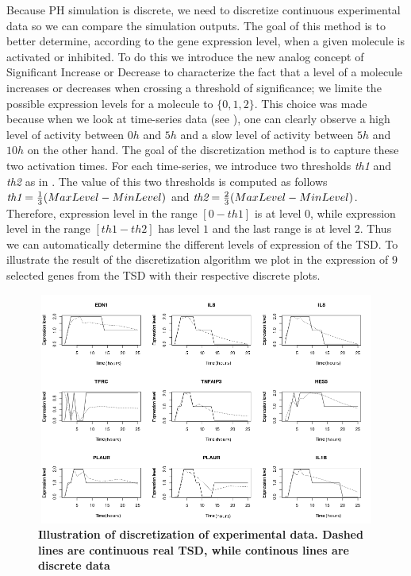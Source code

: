Because PH simulation is discrete, we need to discretize continuous experimental data so we can compare the simulation outputs.
The goal of this method is to better determine, according to the gene expression level, when  a given molecule is activated or inhibited.
To do this we introduce the new analog concept of Significant Increase or Decrease to characterize the fact that a level of a molecule 
increases or decreases when crossing a threshold of significance; we limite the possible expression levels for a molecule to
$\{0, 1, 2\}$. This choice was made because when we look at time-series data (see ), one can clearly observe a high level of
activity between $0h$ and $5h$ and a slow level of activity between $5h$ and $10h$ on the other hand. The goal of the discretization method is to capture these
two activation times. For each time-series, we introduce two thresholds \emph{th1} and \emph{th2} as in . The value of this two
thresholds is computed as follows $\emph{th1}=\frac{1}{3}(MaxLevel-MinLevel)$ and $\emph{th2}=\frac{2}{3}(MaxLevel-MinLevel)$. Therefore, 
expression level in the range $[0-th1]$ is at level $0$, while expression level in the range $[th1-th2]$  has level $1$ and the last range is at
level $2$. Thus we can automatically determine the different levels of expression of the TSD. 
To illustrate the result of the discretization algorithm we plot in  the expression 
of $9$ selected genes from the TSD with their respective discrete plots. 

\begin{figure}[!ht]
 \centering
 \includegraphics[width=5in,height=3in]{images/ResultDiscretization.png}
 \caption{\bf Illustration of discretization of experimental data. Dashed lines are continuous real TSD, while continous lines are discrete data}
 \label{fig:illustrationDiscretisation}
\end{figure}

